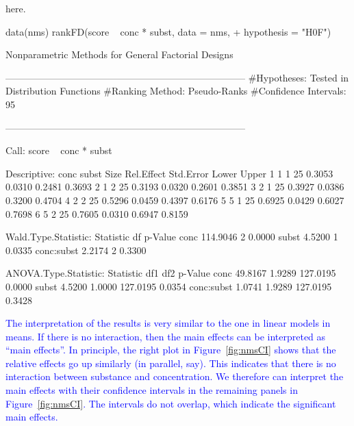 here.
\begin{example}
data(nms)	
rankFD(score ~ conc * subst, data = nms, 
+	  hypothesis = "H0F")
\end{example}
\begin{example}

Nonparametric Methods for General Factorial Designs      

---------------------------------------------------------------------------
#Hypotheses: Tested in Distribution Functions 
#Ranking Method: Pseudo-Ranks 
#Confidence Intervals: 95 %

---------------------------------------------------------------------------

Call:
score ~ conc * subst

Descriptive:
  conc subst Size Rel.Effect Std.Error  Lower  Upper
1    1     1   25     0.3053    0.0310 0.2481 0.3693
2    1     2   25     0.3193    0.0320 0.2601 0.3851
3    2     1   25     0.3927    0.0386 0.3200 0.4704
4    2     2   25     0.5296    0.0459 0.4397 0.6176
5    5     1   25     0.6925    0.0429 0.6027 0.7698
6    5     2   25     0.7605    0.0310 0.6947 0.8159

Wald.Type.Statistic:
            Statistic df p-Value
conc        114.9046  2  0.0000
subst         4.5200  1  0.0335
conc:subst    2.2174  2  0.3300

ANOVA.Type.Statistic:
            Statistic    df1   df2   p-Value
conc         49.8167 1.9289 127.0195  0.0000
subst         4.5200 1.0000 127.0195  0.0354
conc:subst    1.0741 1.9289 127.0195  0.3428


\end{example}
\textcolor{blue}{The interpretation of the results is very similar to the one in linear models in means. If there is no interaction, then the main effects can be interpreted as ``main effects''. In principle, the right plot in Figure~\ref{fig:nmsCI} shows that the relative effects go up similarly (in parallel, say). This indicates that there is no interaction between substance and concentration. We therefore can interpret the main effects with their confidence intervals in the remaining panels in Figure~\ref{fig:nmsCI}. The intervals do not overlap, which indicate the significant main effects.}
